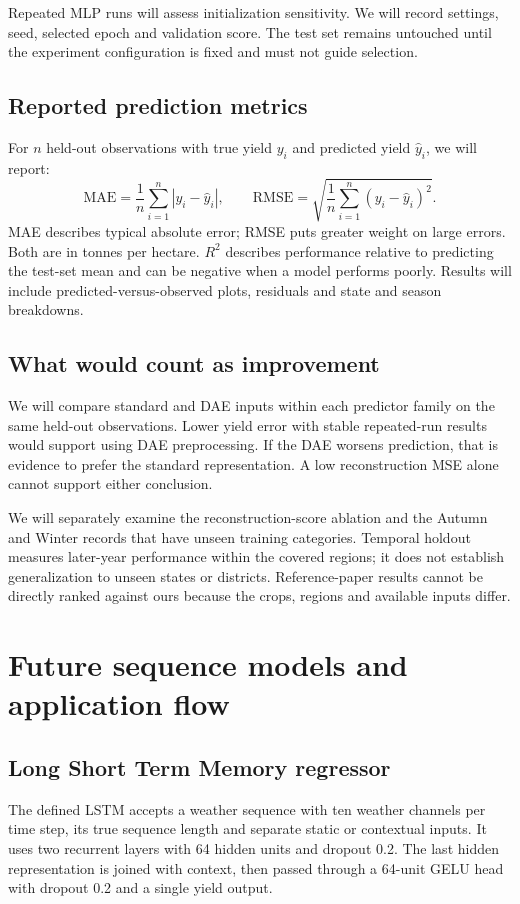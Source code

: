 \documentclass[11pt,a4paper]{article}
\begin{document}
Repeated MLP runs will assess initialization sensitivity. We will record settings, seed, selected epoch and validation score. The test set remains untouched until the experiment configuration is fixed and must not guide selection.

\subsection*{Reported prediction metrics}
For $n$ held-out observations with true yield $y_i$ and predicted yield $\hat y_i$, we will report:
\[
\mathrm{MAE}=\frac{1}{n}\sum_{i=1}^{n}|y_i-\hat y_i|,
\qquad
\mathrm{RMSE}=\sqrt{\frac{1}{n}\sum_{i=1}^{n}(y_i-\hat y_i)^2}.
\]
MAE describes typical absolute error; RMSE puts greater weight on large errors. Both are in tonnes per hectare. $R^2$ describes performance relative to predicting the test-set mean and can be negative when a model performs poorly. Results will include predicted-versus-observed plots, residuals and state and season breakdowns.

\subsection*{What would count as improvement}
We will compare standard and DAE inputs within each predictor family on the same held-out observations. Lower yield error with stable repeated-run results would support using DAE preprocessing. If the DAE worsens prediction, that is evidence to prefer the standard representation. A low reconstruction MSE alone cannot support either conclusion.

We will separately examine the reconstruction-score ablation and the Autumn and Winter records that have unseen training categories. Temporal holdout measures later-year performance within the covered regions; it does not establish generalization to unseen states or districts. Reference-paper results cannot be directly ranked against ours because the crops, regions and available inputs differ.

\clearpage\section*{Future sequence models and application flow}
\subsection*{Long Short Term Memory regressor}
The defined LSTM accepts a weather sequence with ten weather channels per time step, its true sequence length and separate static or contextual inputs. It uses two recurrent layers with 64 hidden units and dropout 0.2. The last hidden representation is joined with context, then passed through a 64-unit GELU head with dropout 0.2 and a single yield output.
\end{document}
